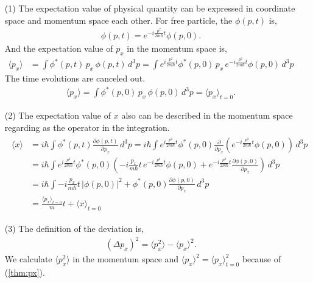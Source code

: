 \documentclass[floatfix,nofootinbib,superscriptaddress,fleqn]{revtex4}
\begin{document}
\begin{itemize}
  \item[(1)]The expectation value of physical quantity can be 
  expressed in coordinate space and momentum space each other.
  For free particle, the $\phi(p,t)$ is,
  \begin{align}\label{phi:te}
    \phi(p,t)=e^{-i\frac{p^2}{2m\hbar}t}\phi(p,0)  .
  \end{align}
  And the expectation value of $p_x$ in the momentum space is,
  \begin{align*}
    \langle p_x \rangle &= \int \phi^*(p,t)\,p_x\,\phi(p,t)\,d^3p
    =\int e^{i\frac{p^2}{2m\hbar}t}\phi^*(p,0)\,p_x\,
    e^{-i\frac{p^2}{2m\hbar}t}\phi(p,0)\,d^3p
  \end{align*}
  The time evolutions are canceled out.
  \begin{align}\label{thm:px}
    \langle p_x \rangle=\int \phi^*(p,0)\,p_x\,\phi(p,0)\,d^3p 
    = \langle p_x \rangle_{t=0}.
  \end{align}
  \item[(2)] The expectation value of $x$ also can be described in 
  the momentum space regarding as the operator in the integration.
  \begin{align}
    \begin{split}
      \langle x\rangle &= i\hbar\int \phi^*(p,t)
      \frac{\partial\phi(p,t)}{\partial p_x}\,d^3p 
    =i\hbar\int e^{i\frac{p^2}{2m\hbar}t}\phi^*(p,0)
    \frac{\partial}{\partial p_x}\left(e^{-i
    \frac{p^2}{2m\hbar}t}\phi(p,0)\right)\,d^3p  \\
    &=i\hbar\int e^{i\frac{p^2}{2m\hbar}t}\phi^*(p,0)
    \left(-i\frac{p_x}{m\hbar}t\,e^{-i\frac{p^2}{2m\hbar}t}\phi(p,0)
    +e^{-i\frac{p^2}{2m\hbar}t}
    \frac{\partial \phi(p,0)}{\partial p_x}\right)\,d^3p \\
    &=i\hbar\int -i\frac{p_x}{m\hbar}t\,|\phi(p,0)|^2
    +\phi^*(p,0)\frac{\partial \phi(p,0)}{\partial p_x}\,d^3p \\
    &=\frac{\langle p_x\rangle_{t=0}}{m}t+\langle x\rangle_{t=0} 
    \end{split}
  \end{align}
  \item[(3)] The definition of the deviation is,
  \begin{align}\label{def:deviation}
    (\Delta p_x)^2 = \langle p_x^2 \rangle-\langle p_x \rangle^2. 
  \end{align}
  We calculate $\langle p_x^2 \rangle$ in the momentum space 
  and $\langle p_x \rangle^2=\langle p_x \rangle^2_{t=0}$ because of (\ref{thm:px}).

\end{itemize}
\end{document}
